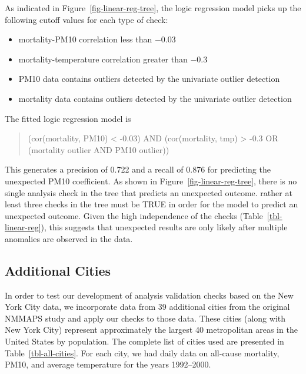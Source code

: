 \documentclass[
  12pt,
]{interact}
\providecommand{\tightlist}{%
  \setlength{\itemsep}{0pt}\setlength{\parskip}{0pt}}
\begin{document}
As indicated in Figure~\ref{fig-linear-reg-tree}, the logic regression
model picks up the following cutoff values for each type of check:

\begin{itemize}
\tightlist
\item
  mortality-PM10 correlation less than \(-0.03\)
\item
  mortality-temperature correlation greater than \(-0.3\)
\item
  PM10 data contains outliers detected by the univariate outlier
  detection
\item
  mortality data contains outliers detected by the univariate outlier
  detection
\end{itemize}

The fitted logic regression model is

\begin{quote}
(cor(mortality, PM10) \textless{} -0.03) AND (cor(mortality, tmp)
\textgreater{} -0.3 OR (mortality outlier AND PM10 outlier))
\end{quote}

This generates a precision of 0.722 and a recall of 0.876 for predicting
the unexpected PM10 coefficient. As shown in
Figure~\ref{fig-linear-reg-tree}, there is no single analysis check in
the tree that predicts an unexpected outcome. rather at least three
checks in the tree must be TRUE in order for the model to predict an
unexpected outcome. Given the high independence of the checks
(Table~\ref{tbl-linear-reg}), this suggests that unexpected results are
only likely after multiple anomalies are observed in the data.

\subsection{Additional Cities}\label{additional-cities}

In order to test our development of analysis validation checks based on
the New York City data, we incorporate data from 39 additional cities
from the original NMMAPS study and apply our checks to those data. These
cities (along with New York City) represent approximately the largest 40
metropolitan areas in the United States by population. The complete list
of cities used are presented in Table~\ref{tbl-all-cities}. For each
city, we had daily data on all-cause mortality, PM10, and average
temperature for the years 1992--2000.
\end{document}

